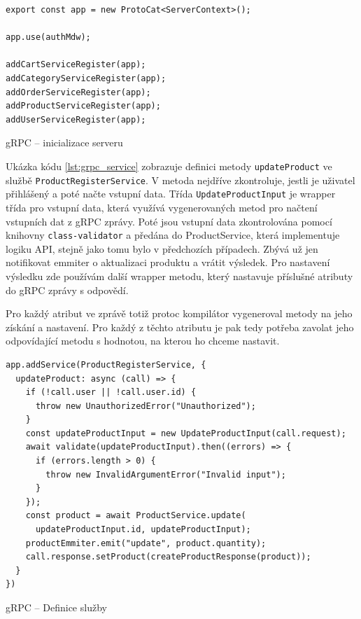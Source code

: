 \documentclass[thesis=M,czech]{FITthesis}[2019/12/23]
\begin{document}
\begin{listing}
\begin{verbatim}
export const app = new ProtoCat<ServerContext>();

app.use(authMdw);

addCartServiceRegister(app);
addCategoryServiceRegister(app);
addOrderServiceRegister(app);
addProductServiceRegister(app);
addUserServiceRegister(app);
\end{verbatim}
\caption{gRPC -- inicializace serveru}
\label{lst:grpc_init}
\end{listing}


Ukázka kódu \ref{lst:grpc_service} zobrazuje definici metody \texttt{updateProduct} ve službě \texttt{ProductRegisterService}. V metoda nejdříve zkontroluje, jestli je uživatel přihlášený a poté načte vstupní data. Třída \texttt{UpdateProductInput} je wrapper třída pro vstupní data, která využívá vygenerovaných metod pro načtení vstupních dat z gRPC zprávy. Poté jsou vstupní data zkontrolována pomocí knihovny \texttt{class-validator} a předána do ProductService, která implementuje logiku API, stejně jako tomu bylo v předchozích případech. Zbývá už jen notifikovat emmiter o aktualizaci produktu a vrátit výsledek. Pro nastavení výsledku zde používám další wrapper metodu, který nastavuje příslušné atributy do gRPC zprávy s odpovědí.

Pro každý atribut ve zprávě totiž protoc kompilátor vygeneroval metody na jeho získání a nastavení. Pro každý z těchto atributu je pak tedy potřeba zavolat jeho odpovídající metodu s hodnotou, na kterou ho chceme nastavit.

\begin{listing}
\begin{verbatim}
app.addService(ProductRegisterService, {
  updateProduct: async (call) => {
    if (!call.user || !call.user.id) {
      throw new UnauthorizedError("Unauthorized");
    }
    const updateProductInput = new UpdateProductInput(call.request);
    await validate(updateProductInput).then((errors) => {
      if (errors.length > 0) {
        throw new InvalidArgumentError("Invalid input");
      }
    });
    const product = await ProductService.update(
      updateProductInput.id, updateProductInput);
    productEmmiter.emit("update", product.quantity);
    call.response.setProduct(createProductResponse(product));
  }
})
\end{verbatim}
\caption{gRPC -- Definice služby}
\label{lst:grpc_service}
\end{listing}
\end{document}
